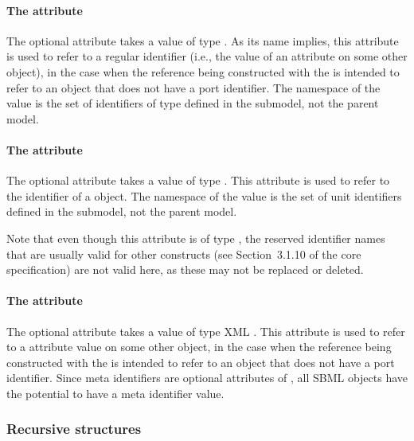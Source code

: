 \paragraph{The \hspace*{1pt} attribute}

The optional attribute  takes a value of type
.  As its name implies, this attribute is used to
refer to a regular identifier (i.e., the value of an 
attribute on some other object), in the case when the reference being
constructed with the \SBaseRef is intended to refer to an object that
does not have a port identifier.  The namespace of the 
value is the set of identifiers of type  defined in the
submodel, not the parent model.


\paragraph{The \hspace*{1pt} attribute}

The optional attribute  takes a value of type
.  This attribute is used to refer to the identifier
of a \UnitDefinition object.  The namespace of the 
value is the set of unit identifiers defined in the submodel, not the
parent model.

Note that even though this attribute is of type ,
the reserved identifier names that are usually valid for other
constructs (see Section~3.1.10 of the core specification) are not valid
here, as these may not be replaced or deleted.


\paragraph{The \hspace*{1pt} attribute}

The optional attribute  takes a value of type XML
.  This attribute is used to refer to a 
attribute value on some other object, in the case when the reference
being constructed with the \SBaseRef is intended to refer to an object
that does not have a port identifier.  Since meta identifiers are
optional attributes of \SBase, all SBML objects have the potential to
have a meta identifier value.


\subsubsection{Recursive  structures}

